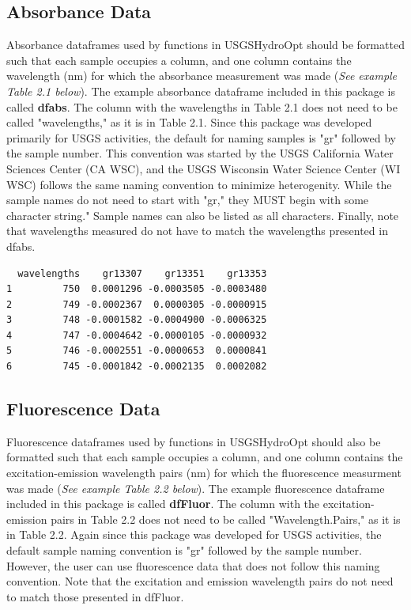 \documentclass[a4paper,11pt]{article}\usepackage[]{graphicx}\usepackage[]{color}
\makeatletter
\newenvironment{kframe}{%
 \def\at@end@of@kframe{}%
 \ifinner\ifhmode%
  \def\at@end@of@kframe{\end{minipage}}%
  \begin{minipage}{\columnwidth}%
 \fi\fi%
 \def\FrameCommand##1{\hskip\@totalleftmargin \hskip-\fboxsep
 \colorbox{shadecolor}{##1}\hskip-\fboxsep
     \hskip-\linewidth \hskip-\@totalleftmargin \hskip\columnwidth}%
 \MakeFramed {\advance\hsize-\width
   \@totalleftmargin\z@ \linewidth\hsize
   \@setminipage}}%
 {\par\unskip\endMakeFramed%
 \at@end@of@kframe}
\newenvironment{knitrout}{}{} %
\makeatother
\begin{document}
\subsection{Absorbance Data}
Absorbance dataframes used by functions in USGSHydroOpt should be formatted such that each sample occupies a column, and one column contains the wavelength (nm) for which the absorbance measurement was made (\emph{See example Table 2.1 below}). The example absorbance dataframe included in this package is called \textbf{dfabs}. The column with the wavelengths in Table 2.1 does not need to be called "wavelengths," as it is in Table 2.1. Since this package was developed primarily for USGS activities, the default for naming samples is "gr" followed by the sample number. This convention was started by the USGS California Water Sciences Center (CA WSC), and the USGS Wisconsin Water Science Center (WI WSC) follows the same naming convention to minimize heterogenity. While the sample names do not need to start with "gr," they MUST begin with some character string." Sample names can also be listed as all characters. Finally, note that wavelengths measured do not have to match the wavelengths presented in dfabs.

\begin{knitrout}
\color{fgcolor}\begin{kframe}
\begin{verbatim}
  wavelengths    gr13307    gr13351    gr13353
1         750  0.0001296 -0.0003505 -0.0003480
2         749 -0.0002367  0.0000305 -0.0000915
3         748 -0.0001582 -0.0004900 -0.0006325
4         747 -0.0004642 -0.0000105 -0.0000932
5         746 -0.0002551 -0.0000653  0.0000841
6         745 -0.0001842 -0.0002135  0.0002082
\end{verbatim}
\end{kframe}
\end{knitrout}

\subsection{Fluorescence Data}
Fluorescence dataframes used by functions in USGSHydroOpt should also be formatted such that each sample occupies a column, and one column contains the excitation-emission wavelength pairs (nm) for which the fluorescence measurment was made (\emph{See example Table 2.2 below}). The example fluorescence dataframe included in this package is called \textbf{dfFluor}. The column with the excitation-emission pairs in Table 2.2 does not need to be called "Wavelength.Pairs," as it is in Table 2.2. Again since this package was developed for USGS activities, the default sample naming convention is "gr" followed by the sample number. However, the user can use fluorescence data that does not follow this naming convention. Note that the excitation and emission wavelength pairs do not need to match those presented in dfFluor.
\end{document}
